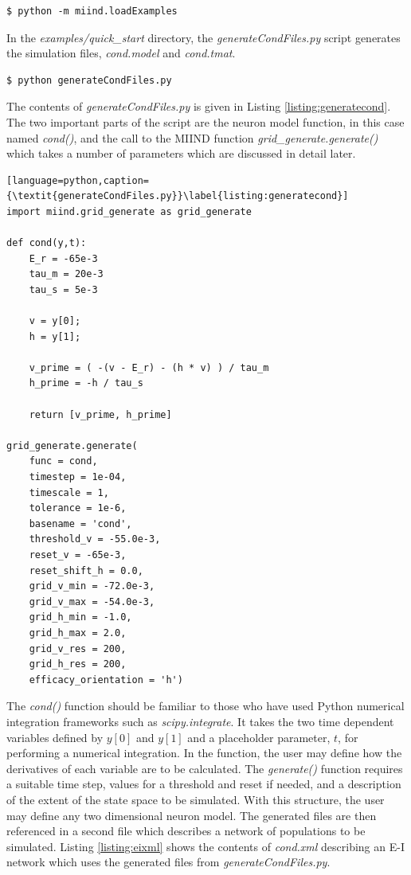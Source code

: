 \documentclass[utf8]{frontiersSCNS} %
\begin{document}
\begin{lstlisting}
$ python -m miind.loadExamples
\end{lstlisting}

In the \textit{examples/quick\_start} directory, the \textit{generateCondFiles.py} script generates the simulation files, \textit{cond.model} and \textit{cond.tmat}.

\begin{lstlisting}
$ python generateCondFiles.py
\end{lstlisting}

The contents of \textit{generateCondFiles.py} is given in Listing \ref{listing:generatecond}. The two important parts of the script are the neuron model function, in this case named \textit{cond()}, and the call to the MIIND function \textit{grid\_generate.generate()} which takes a number of parameters which are discussed in detail later.

\begin{lstlisting}[language=python,caption={\textit{generateCondFiles.py}}\label{listing:generatecond}]
import miind.grid_generate as grid_generate

def cond(y,t):
    E_r = -65e-3
    tau_m = 20e-3
    tau_s = 5e-3

    v = y[0];
    h = y[1];

    v_prime = ( -(v - E_r) - (h * v) ) / tau_m
    h_prime = -h / tau_s

    return [v_prime, h_prime]

grid_generate.generate(
    func = cond, 
    timestep = 1e-04, 
    timescale = 1, 
    tolerance = 1e-6, 
    basename = 'cond', 
    threshold_v = -55.0e-3, 
    reset_v = -65e-3, 
    reset_shift_h = 0.0, 
    grid_v_min = -72.0e-3, 
    grid_v_max = -54.0e-3, 
    grid_h_min = -1.0, 
    grid_h_max = 2.0, 
    grid_v_res = 200, 
    grid_h_res = 200, 
    efficacy_orientation = 'h')
\end{lstlisting}

The \textit{cond()} function should be familiar to those who have used Python numerical integration frameworks such as \textit{scipy.integrate}. It takes the two time dependent variables defined by $y[0]$ and $y[1]$ and a placeholder parameter, $t$, for performing a numerical integration. In the function, the user may define how the derivatives of each variable are to be calculated. The \textit{generate()} function requires a suitable time step, values for a threshold and reset if needed, and a description of the extent of the state space to be simulated. With this structure, the user may define any two dimensional neuron model. The generated files are then referenced in a second file which describes a network of populations to be simulated. Listing \ref{listing:eixml} shows the contents of \textit{cond.xml} describing an E-I network which uses the generated files from \textit{generateCondFiles.py}.
\end{document}
